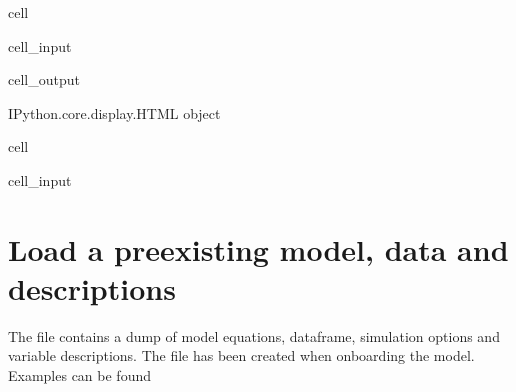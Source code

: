 \documentclass[letterpaper,10pt,english]{jupyterBook}
\begin{document}
\begin{sphinxuseclass}{cell}\begin{sphinxVerbatimInput}

\begin{sphinxuseclass}{cell_input}
\begin{sphinxVerbatim}[commandchars=\\\{\}]
    
 
\end{sphinxVerbatim}

\end{sphinxuseclass}\end{sphinxVerbatimInput}
\begin{sphinxVerbatimOutput}

\begin{sphinxuseclass}{cell_output}
\begin{sphinxVerbatim}[commandchars=\\\{\}]
\PYGZlt{}IPython.core.display.HTML object\PYGZgt{}
\end{sphinxVerbatim}

\end{sphinxuseclass}\end{sphinxVerbatimOutput}

\end{sphinxuseclass}
\begin{sphinxuseclass}{cell}\begin{sphinxVerbatimInput}

\begin{sphinxuseclass}{cell_input}
\begin{sphinxVerbatim}[commandchars=\\\{\}]
 

   
   
\end{sphinxVerbatim}

\end{sphinxuseclass}\end{sphinxVerbatimInput}

\end{sphinxuseclass}

\section{Load a pre\sphinxhyphen{}existing model, data and descriptions}
\label{\detokenize{content/howto/targetinstruments/One target one instrument with 3 instrument variables:load-a-pre-existing-model-data-and-descriptions}}
\sphinxAtStartPar
The file  contains a dump of model equations, dataframe, simulation options and variable descriptions. The file has been created when onboarding the model.
Examples can be found 
\end{document}
